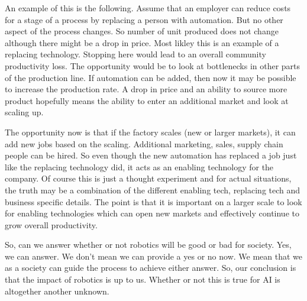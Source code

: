 An example of this is the following. Assume that an employer can reduce
costs for a stage of a process by replacing a person with automation.
But no other aspect of the process changes. So number of unit produced
does not change although there might be a drop in price. Most likley
this is an example of a replacing technology. Stopping here would lead
to an overall community productivity loss. The opportunity would be to
look at bottlenecks in other parts of the production line. If automation
can be added, then now it may be possible to increase the production
rate. A drop in price and an ability to source more product hopefully
means the ability to enter an additional market and look at scaling up.

The opportunity now is that if the factory scales (new or larger
markets), it can add new jobs based on the scaling. Additional
marketing, sales, supply chain people can be hired. So even though the
new automation has replaced a job just like the replacing technology
did, it acts as an enabling technology for the company. Of course this
is just a thought experiment and for actual situations, the truth may be
a combination of the different enabling tech, replacing tech and
business specific details. The point is that it is important on a larger
scale to look for enabling technologies which can open new markets and
effectively continue to grow overall productivity.

So, can we answer whether or not robotics will be good or bad for
society. Yes, we can answer. We don't mean we can provide a yes or no
now. We mean that we as a society can guide the process to achieve
either answer. So, our conclusion is that the impact of robotics is up
to us. Whether or not this is true for AI is altogether another unknown.
